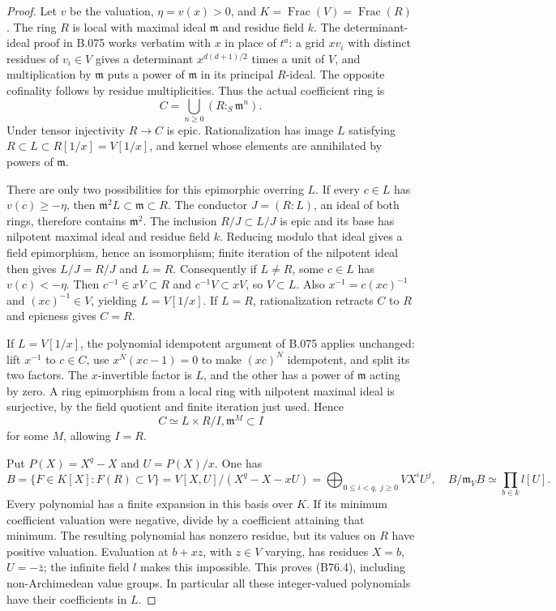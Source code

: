 \begin{proof}
Let $v$ be the valuation, $\eta=v(x)>0$, and $K=\operatorname{Frac}(V)
=\operatorname{Frac}(R)$. The ring $R$ is local with maximal ideal
$\mathfrak m$ and residue field $k$. The determinant-ideal proof in
B.075 works verbatim with $x$ in place of $t^a$: a grid $xv_i$ with
distinct residues of $v_i\in V$ gives a determinant $x^{d(d+1)/2}$ times
a unit of $V$, and multiplication by $\mathfrak m$ puts a power of
$\mathfrak m$ in its principal $R$-ideal. The opposite cofinality follows
by residue multiplicities. Thus the actual coefficient ring is
\[
                 C=\bigcup_{n\ge0}(R:_S\mathfrak m^n).    \tag{B76.2}
\]
Under tensor injectivity $R\to C$ is epic. Rationalization has image
$L$ satisfying $R\subset L\subset R[1/x]=V[1/x]$, and kernel whose
elements are annihilated by powers of $\mathfrak m$.

There are only two possibilities for this epimorphic overring $L$.
If every $c\in L$ has $v(c)\ge-\eta$, then
$\mathfrak m^2L\subset\mathfrak m\subset R$.
The conductor $J=(R:L)$, an ideal of both rings, therefore contains
$\mathfrak m^2$. The inclusion $R/J\subset L/J$ is epic and its base
has nilpotent maximal ideal and residue field $k$. Reducing modulo
that ideal gives a field epimorphism, hence an isomorphism; finite
iteration of the nilpotent ideal then gives $L/J=R/J$ and $L=R$.
Consequently if $L\ne R$, some $c\in L$ has $v(c)<-\eta$.
Then $c^{-1}\in xV\subset R$ and $c^{-1}V\subset xV$, so $V\subset L$.
Also $x^{-1}=c(xc)^{-1}$ and $(xc)^{-1}\in V$, yielding $L=V[1/x]$.
If $L=R$, rationalization retracts $C$ to $R$ and epicness gives $C=R$.

If $L=V[1/x]$, the polynomial idempotent argument of B.075 applies
unchanged: lift $x^{-1}$ to $c\in C$, use
$x^N(xc-1)=0$ to make $(xc)^N$ idempotent, and split its two factors.
The $x$-invertible factor is $L$, and the other has a power of
$\mathfrak m$ acting by zero. A ring epimorphism from a local ring
with nilpotent maximal ideal is surjective, by the field quotient
and finite iteration just used. Hence
\[
                    C\simeq L\times R/I,
                    \mathfrak m^M\subset I               \tag{B76.3}
\]
for some $M$, allowing $I=R$.

Put $P(X)=X^q-X$ and $U=P(X)/x$. One has
\[
 B=\{F\in K[X]:F(R)\subset V\}
   =V[X,U]/(X^q-X-xU)
   =\bigoplus_{0\le i<q,\ j\ge0}VX^iU^j,
 \quad B/\mathfrak m_VB\simeq\prod_{b\in k}l[U].         \tag{B76.4}
\]
Every polynomial has a finite expansion in this basis over $K$.
If its minimum coefficient valuation were negative, divide by a
coefficient attaining that minimum. The resulting polynomial has
nonzero residue, but its values on $R$ have positive valuation.
Evaluation at $b+xz$, with $z\in V$ varying, has residues
$X=b$, $U=-\bar z$; the infinite field $l$ makes this impossible.
This proves (B76.4), including non-Archimedean value groups.
In particular all these integer-valued polynomials have their
coefficients in $L$.


\end{proof}
